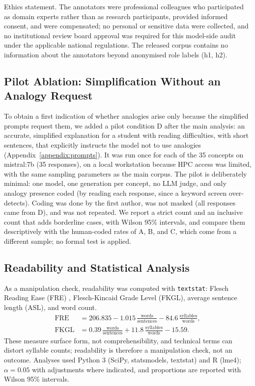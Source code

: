\documentclass[journal,article,submit,pdftex,moreauthors]{Definitions/mdpi}
\begin{document}
Ethics statement. The annotators were professional colleagues who participated as domain experts rather than as research participants, provided informed consent, and were compensated; no personal or sensitive data were collected, and no institutional review board approval was required for this model-side audit under the applicable national regulations. The released corpus contains no information about the annotators beyond anonymised role labels (h1, h2).

\subsection{Pilot Ablation: Simplification Without an Analogy Request}
\label{sec:method:pilot}

To obtain a first indication of whether analogies arise only because the simplified prompts request them, we added a pilot condition D after the main analysis: an accurate, simplified explanation for a student with reading difficulties, with short sentences, that explicitly instructs the model not to use analogies (Appendix~\ref{appendix:prompts}). It was run once for each of the 35 concepts on mistral:7b (35 responses), on a local workstation because HPC access was limited, with the same sampling parameters as the main corpus. The pilot is deliberately minimal: one model, one generation per concept, no LLM judge, and only analogy presence coded (by reading each response, since a keyword screen over-detects). Coding was done by the first author, was not masked (all responses came from D), and was not repeated. We report a strict count and an inclusive count that adds borderline cases, with Wilson 95\% intervals, and compare them descriptively with the human-coded rates of A, B, and C, which come from a different sample; no formal test is applied.

\subsection{Readability and Statistical Analysis}
\label{sec:method:stat}

As a manipulation check, readability was computed with \texttt{textstat}: Flesch Reading Ease (FRE) \cite{flesch1948new}, Flesch-Kincaid Grade Level (FKGL), average sentence length (ASL), and word count. \begin{align}
\mathrm{FRE} &= 206.835 - 1.015\,\frac{\text{words}}{\text{sentences}} - 84.6\,\frac{\text{syllables}}{\text{words}},\\
\mathrm{FKGL} &= 0.39\,\frac{\text{words}}{\text{sentences}} + 11.8\,\frac{\text{syllables}}{\text{words}} - 15.59.
\end{align}
These measure surface form, not comprehensibility, and technical terms can distort syllable counts; readability is therefore a manipulation check, not an outcome. Analyses used Python 3 (SciPy, statsmodels, textstat) and R (lme4); $\alpha = 0.05$ with adjustments where indicated, and proportions are reported with Wilson 95\% intervals.
\end{document}
